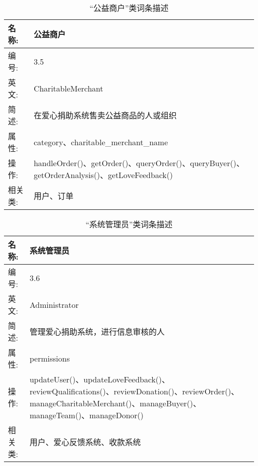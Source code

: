 \begin{table}[H]  
\caption{“公益商户”类词条描述}  
\begin{center}  
    \begin{tabular}{l p{11cm}} 
        \hline
        \quad 名称:  &  公益商户 \\
        \hline
        \quad 编号:  & 3.5 \\
        \hline
        \quad 英文:  &  CharitableMerchant \\
        \hline
        \quad 简述:  & 在爱心捐助系统售卖公益商品的人或组织 \\
        \hline
        \quad 属性:  & category、charitable\_merchant\_name \\
        \hline
        \quad 操作:  & handleOrder()、getOrder()、queryOrder()、queryBuyer()、getOrderAnalysis()、getLoveFeedback()\\
        \hline
        \quad 相关类:  & 用户、订单 \\
        \hline
    \end{tabular}
\end{center}
\end{table}

\begin{table}[H]  
\caption{“系统管理员”类词条描述}  
\begin{center}  
    \begin{tabular}{l p{11cm}} 
        \hline
        \quad 名称:  &  系统管理员 \\
        \hline
        \quad 编号:  & 3.6 \\
        \hline
        \quad 英文:  &  Administrator \\
        \hline
        \quad 简述:  & 管理爱心捐助系统，进行信息审核的人 \\
        \hline
        \quad 属性:  & permissions \\
        \hline
        \quad 操作:  & updateUser()、updateLoveFeedback()、reviewQualifications()、reviewDonation()、reviewOrder()、manageCharitableMerchant()、manageBuyer()、manageTeam()、manageDonor()
\\
        \hline
        \quad 相关类:  & 用户、爱心反馈系统、收款系统 \\
        \hline
    \end{tabular}
\end{center}
\end{table}

